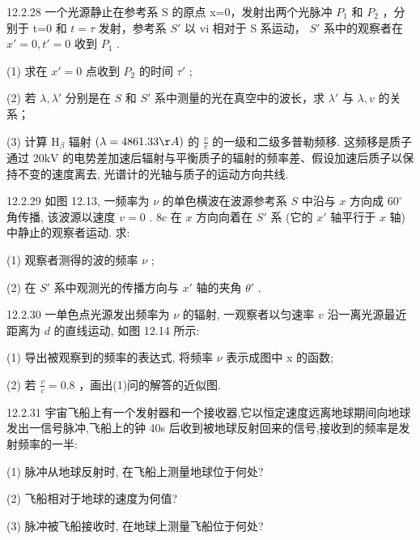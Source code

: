 \begin{problem}{12.2.28}
一个光源静止在参考系 S 的原点 x=0，发射出两个光脉冲 $P_{1}$ 和 $P_{2}$ ，分别于 t=0 和 $t=\tau$ 发射，参考系 $S'$ 以 vi 相对于 S 系运动， $S'$ 系中的观察者在 $x'=0, t'=0$ 收到 $P_{1}$ .

(1) 求在 $x' = 0$ 点收到 $P_{2}$ 的时间 $\tau'$ ;

(2) 若 $\lambda, \lambda'$ 分别是在 $S$ 和 $S'$ 系中测量的光在真空中的波长，求 $\lambda'$ 与 $\lambda, v$ 的关系；

(3) 计算 $\mathrm{H}_{\beta}$ 辐射 $(\lambda = 4861.33\AA)$ 的 $\frac{v}{c}$ 的一级和二级多普勒频移. 这频移是质子通过 $20\mathrm{kV}$ 的电势差加速后辐射与平衡质子的辐射的频率差、假设加速后质子以保持不变的速度离去, 光谱计的光轴与质子的运动方向共线.
\end{problem}
\clearpage


\begin{problem}{12.2.29}
如图 12.13, 一频率为 $\nu$ 的单色横波在波源参考系 $S$ 中沿与 $x$ 方向成 $60^{\circ}$ 角传播, 该波源以速度 $v = 0$ . 8c 在 $x$ 方向向着在 $S'$ 系 (它的 $x'$ 轴平行于 $x$ 轴) 中静止的观察者运动. 求:

(1) 观察者测得的波的频率 $\nu$ ;

(2) 在 $S'$ 系中观测光的传播方向与 $x'$ 轴的夹角 $\theta'$ .
\begin{center}

\end{center}
\end{problem}
\clearpage


\begin{problem}{12.2.30}
一单色点光源发出频率为 $\nu$ 的辐射, 一观察者以匀速率 $v$ 沿一离光源最近距离为 $d$ 的直线运动, 如图 12.14 所示:

(1) 导出被观察到的频率的表达式, 将频率 $\nu$ 表示成图中 x 的函数;

(2) 若 $\frac{v}{c}=0.8$ ，画出(1)问的解答的近似图.
\begin{center}

\end{center}
\end{problem}
\clearpage


\begin{problem}{12.2.31}
宇宙飞船上有一个发射器和一个接收器,它以恒定速度远离地球期间向地球发出一信号脉冲,飞船上的钟 40s 后收到被地球反射回来的信号,接收到的频率是发射频率的一半:

(1) 脉冲从地球反射时, 在飞船上测量地球位于何处?

(2) 飞船相对于地球的速度为何值?

(3) 脉冲被飞船接收时, 在地球上测量飞船位于何处?
\end{problem}
\clearpage



